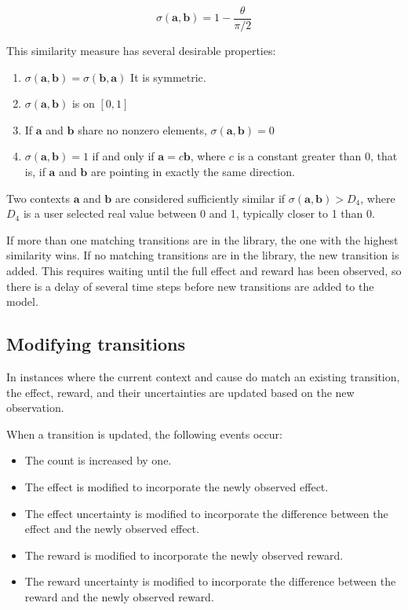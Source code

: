 \begin{equation}    
\sigma(\mathbf{a},\mathbf{b}) = 1 - \frac{\theta}{\pi/2}
\label{similarity}
\end{equation}

This similarity measure has several desirable properties:
\begin{enumerate}
\item $\sigma(\mathbf{a},\mathbf{b}) = \sigma(\mathbf{b},\mathbf{a})$ It is symmetric.
\item $\sigma(\mathbf{a},\mathbf{b})$ is on $[0,1]$
\item If $\mathbf{a}$ and $\mathbf{b}$ share no nonzero elements, $\sigma(\mathbf{a},\mathbf{b}) = 0$
\item $\sigma(\mathbf{a},\mathbf{b}) = 1$ if and only if $\mathbf{a} = c \mathbf{b}$, where $c$ is a constant greater than 0, that is, if $\mathbf{a}$ and $\mathbf{b}$ are pointing in exactly the same direction.
\end{enumerate}

Two contexts $\mathbf{a}$ and $\mathbf{b}$ are considered sufficiently similar if $\sigma(\mathbf{a},\mathbf{b}) > D_4$, where $D_4$ is a user selected real value between 0 and 1, typically closer to 1 than 0.

If more than one matching transitions are in the library, the one with the highest similarity wins. If no matching transitions are in the library, the new transition is added. This requires waiting until the full effect and reward has been observed, so there is a delay of several time steps before new transitions are added to the model.

\subsection{Modifying transitions}
In instances where the current context and cause do match an existing transition, the effect, reward, and their uncertainties are updated based on the new observation.

When a transition is updated, the following events occur:
\begin{itemize}
\item The count is increased by one.
\item The effect is modified to incorporate the newly observed effect.
\item The effect uncertainty is modified to incorporate the difference between the effect and the newly observed effect.
\item The reward is modified to incorporate the newly observed reward.
\item The reward uncertainty is modified to incorporate the difference between the reward and the newly observed reward.
\end{itemize}

